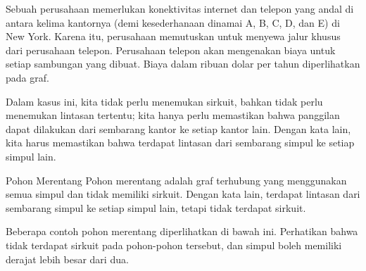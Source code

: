 Sebuah perusahaan memerlukan konektivitas internet dan telepon yang andal di antara kelima kantornya (demi kesederhanaan dinamai A, B, C, D, dan E) di New York. Karena itu, perusahaan memutuskan untuk menyewa jalur khusus dari perusahaan telepon.  Perusahaan telepon akan mengenakan biaya untuk setiap sambungan yang dibuat.  Biaya dalam ribuan dolar per tahun diperlihatkan pada graf.

\begin{center}
\par{}\label{fig:graphtheory-dor1-tikz23}%

\end{center}

Dalam kasus ini, kita tidak perlu menemukan sirkuit, bahkan tidak perlu menemukan lintasan tertentu; kita hanya perlu memastikan bahwa panggilan dapat dilakukan dari sembarang kantor ke setiap kantor lain.  Dengan kata lain, kita harus memastikan bahwa terdapat lintasan dari sembarang simpul ke setiap simpul lain.

\begin{definition}{Pohon Merentang}
Pohon merentang adalah graf terhubung yang menggunakan semua simpul dan tidak memiliki sirkuit.  
Dengan kata lain, terdapat lintasan dari sembarang simpul ke setiap simpul lain, tetapi tidak terdapat sirkuit.   
\end{definition}

Beberapa contoh pohon merentang diperlihatkan di bawah ini.  Perhatikan bahwa tidak terdapat sirkuit pada pohon-pohon tersebut, dan simpul boleh memiliki derajat lebih besar dari dua.\\

